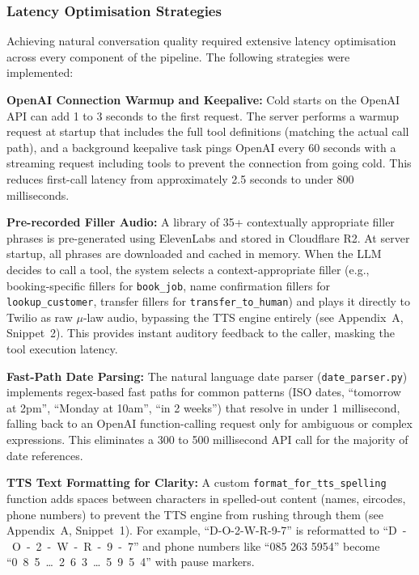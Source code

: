\documentclass[conference]{IEEEtran}
\begin{document}
\subsubsection{Latency Optimisation Strategies}

Achieving natural conversation quality required extensive latency optimisation across every component of the pipeline. The following strategies were implemented:

\textbf{OpenAI Connection Warmup and Keepalive:} Cold starts on the OpenAI API can add 1 to 3 seconds to the first request. The server performs a warmup request at startup that includes the full tool definitions (matching the actual call path), and a background keepalive task pings OpenAI every 60 seconds with a streaming request including tools to prevent the connection from going cold. This reduces first-call latency from approximately 2.5 seconds to under 800 milliseconds.

\textbf{Pre-recorded Filler Audio:} A library of 35+ contextually appropriate filler phrases is pre-generated using ElevenLabs and stored in Cloudflare R2. At server startup, all phrases are downloaded and cached in memory. When the LLM decides to call a tool, the system selects a context-appropriate filler (e.g., booking-specific fillers for \texttt{book\_job}, name confirmation fillers for \texttt{lookup\_customer}, transfer fillers for \texttt{transfer\_to\_human}) and plays it directly to Twilio as raw $\mu$-law audio, bypassing the TTS engine entirely (see Appendix~A, Snippet~2). This provides instant auditory feedback to the caller, masking the tool execution latency.

\textbf{Fast-Path Date Parsing:} The natural language date parser (\texttt{date\_parser.py}) implements regex-based fast paths for common patterns (ISO dates, ``tomorrow at 2pm'', ``Monday at 10am'', ``in 2 weeks'') that resolve in under 1 millisecond, falling back to an OpenAI function-calling request only for ambiguous or complex expressions. This eliminates a 300 to 500 millisecond API call for the majority of date references.

\textbf{TTS Text Formatting for Clarity:} A custom \texttt{format\_for\_tts\_spelling} function adds spaces between characters in spelled-out content (names, eircodes, phone numbers) to prevent the TTS engine from rushing through them (see Appendix~A, Snippet~1). For example, ``D-O-2-W-R-9-7'' is reformatted to ``D~-~O~-~2~-~W~-~R~-~9~-~7'' and phone numbers like ``085 263 5954'' become ``0~8~5~\ldots~2~6~3~\ldots~5~9~5~4'' with pause markers.
\end{document}
